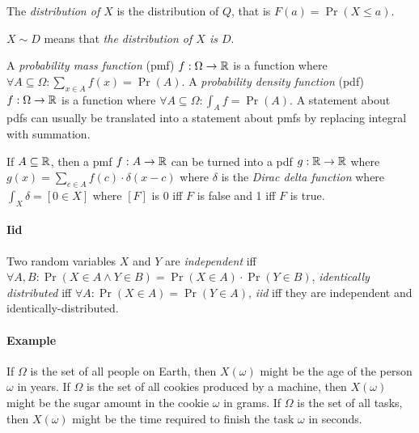 The \emph{distribution of \(X\)} is the distribution of \(Q\),
that is \(F(a) = \Pr(X \le a)\).

\(X \sim D\) means that \emph{the distribution of \(X\) is \(D\)}.

%
A \emph{probability mass function} (pmf) \(f : \Omega \to \mathbb{R}\)
is a function where \(\forall A \subseteq \Omega : \sum_{x \in A} f(x) = \Pr(A)\).
%
A \emph{probability density function} (pdf) \(f : \Omega \to \mathbb{R}\)
is a function where \(\forall A \subseteq \Omega : \int_A f = \Pr(A)\).
A statement about pdfs can usually be translated into
a statement about pmfs by replacing integral with summation.

If \(A \subseteq \mathbb{R}\), then a pmf \(f : A \to \mathbb{R}\)
can be turned into a pdf \(g : \mathbb{R} \to \mathbb{R}\)
where
\(g(x) = \sum_{c \in A} f(c) \cdot \delta(x-c)\)
where
%
%
\(\delta\) is the \emph{Dirac delta function}
where
\( \int_X \delta = [0 \in X] \)
where \([F]\) is 0 iff \(F\) is false and 1 iff \(F\) is true.

\paragraph{Iid}
Two random variables \(X\) and \(Y\) are
%
%
\emph{independent} iff \(\forall A, B : \Pr(X \in A \wedge Y \in B) = \Pr(X \in A) \cdot \Pr(Y \in B)\),
%
%
\emph{identically distributed} iff
\(\forall A : \Pr(X \in A) = \Pr(Y \in A)\),
%
%
%
%
\emph{iid} iff they are independent and identically-distributed.

\paragraph{Example}
If \(\Omega\) is the set of all people on Earth,
then \(X(\omega)\) might be the age of the person \(\omega\) in years.
If \(\Omega\) is the set of all cookies produced by a machine,
then \(X(\omega)\) might be the sugar amount in the cookie \(\omega\) in grams.
If \(\Omega\) is the set of all tasks,
then \(X(\omega)\) might be the time required to finish the task \(\omega\) in seconds.

